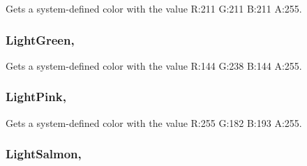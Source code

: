 Gets a system-\/defined color with the value R\+:211 G\+:211 B\+:211 A\+:255.

\hypertarget{structMicrosoft_1_1Xna_1_1Framework_1_1Color_a6391f3062b560628b1fc1cbcf6a60229}{}
\subsubsection[{Light\+Green}]{ Light\+Green\hspace{0.3cm}{\ttfamily [static]}, {\ttfamily [get]}}\label{structMicrosoft_1_1Xna_1_1Framework_1_1Color_a6391f3062b560628b1fc1cbcf6a60229}


Gets a system-\/defined color with the value R\+:144 G\+:238 B\+:144 A\+:255.

\hypertarget{structMicrosoft_1_1Xna_1_1Framework_1_1Color_af9cb1b8803753191cbe22f4f8744627a}{}
\subsubsection[{Light\+Pink}]{ Light\+Pink\hspace{0.3cm}{\ttfamily [static]}, {\ttfamily [get]}}\label{structMicrosoft_1_1Xna_1_1Framework_1_1Color_af9cb1b8803753191cbe22f4f8744627a}


Gets a system-\/defined color with the value R\+:255 G\+:182 B\+:193 A\+:255.

\hypertarget{structMicrosoft_1_1Xna_1_1Framework_1_1Color_aeed458990c50db439c0685772ed98a9b}{}
\subsubsection[{Light\+Salmon}]{ Light\+Salmon\hspace{0.3cm}{\ttfamily [static]}, {\ttfamily [get]}}\label{structMicrosoft_1_1Xna_1_1Framework_1_1Color_aeed458990c50db439c0685772ed98a9b}


